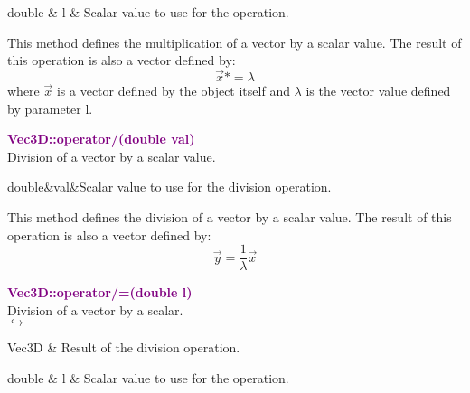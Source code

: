 \begin{tcolorbox}[width=\textwidth,myArgs,tabularx={ll|R}]
double & l & Scalar value to use for the operation.
\end{tcolorbox}

This method defines the multiplication of a vector by a scalar value.
The result of this operation is also a vector defined by:
\begin{equation*}
\overrightarrow{x} *= \lambda
\end{equation*}
where $\overrightarrow{x}$ is a vector defined by the object itself and $\lambda$ is the vector value defined by parameter l.

\textcolor{purple}{\textbf{Vec3D::operator/(double val)}}\label{Vec3D::operator/(double val)}\\
Division of a vector by a scalar value.

\begin{tcolorbox}[width=\textwidth,myArgs,tabularx={ll|R}]
double&val&Scalar value to use for the division operation.
\end{tcolorbox}

This method defines the division of a vector by a scalar value.
The result of this operation is also a vector defined by:
\begin{equation*}
\overrightarrow{y} = \frac{1}{\lambda}\overrightarrow{x}
\end{equation*}

\textcolor{purple}{\textbf{Vec3D::operator/=(double l)}}\label{Vec3D::operator/=(double l)}\\
Division of a vector by a scalar.\\ \hspace*{5mm}$\hookrightarrow$
\vspace*{-2em}\begin{tcolorbox}[grow to left by=-1cm, width=\textwidth-1cm,myArgs,tabularx={l|R}]
Vec3D & Result of the division operation.
\end{tcolorbox}

\begin{tcolorbox}[width=\textwidth,myArgs,tabularx={ll|R}]
double & l & Scalar value to use for the operation.
\end{tcolorbox}

